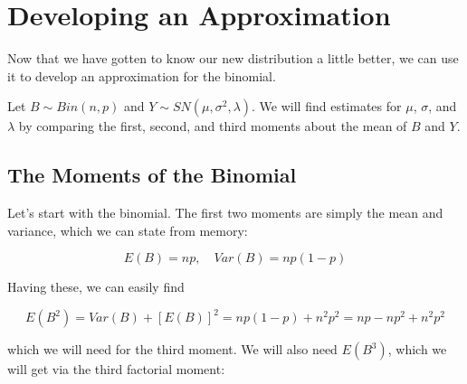 \documentclass{article}
\begin{document}
\section{Developing an Approximation}

Now that we have gotten to know our new distribution a little better, we can
use it to develop an approximation for the binomial.

Let $B \sim Bin(n, p)$ and $Y \sim SN(\mu, \sigma^2, \lambda)$. We will find
estimates for $\mu$, $\sigma$, and $\lambda$ by comparing the first, second,
and third moments about the mean of $B$ and $Y$.

\subsection{The Moments of the Binomial}

Let's start with the binomial. The first two moments are simply the mean and
variance, which we can state from memory:

\begin{equation*}
  E(B) = np, \quad Var(B) = np(1-p)
\end{equation*}

Having these, we can easily find

\begin{equation*}
  E(B^2) = Var(B) + [E(B)]^2 = np(1-p) + n^2p^2 = np - np^2 + n^2p^2
\end{equation*}

which we will need for the third moment. We will also need $E(B^3)$, which we
will get via the third factorial moment:
\end{document}
